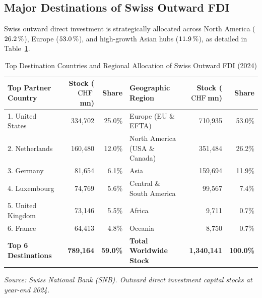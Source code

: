 \subsection{Major Destinations of Swiss Outward FDI}

Swiss outward direct investment is strategically allocated across North America ($26.2\,\%$), Europe ($53.0\,\%$), and high-growth Asian hubs ($11.9\,\%$), as detailed in Table~\ref{tab:outward_summary}.

\begin{table}[H]
\centering
\small
\caption{Top Destination Countries and Regional Allocation of Swiss Outward FDI (2024)}
\label{tab:outward_summary}
\renewcommand{\arraystretch}{1.12}
\begin{tabularx}{\textwidth}{>{\raggedright}X r r | >{\raggedright}X r r}
\toprule
\rowcolor{tableheadbg}
\textbf{Top Partner Country} & \textbf{Stock ($\text{CHF}$\,mn)} & \textbf{Share} & \textbf{Geographic Region} & \textbf{Stock ($\text{CHF}$\,mn)} & \textbf{Share} \\
\midrule
1. United States & 334,702 & 25.0\% & Europe (EU \& EFTA) & 710,935 & 53.0\% \\
\rowcolor{tablerowbg}
2. Netherlands & 160,480 & 12.0\% & North America (USA \& Canada) & 351,484 & 26.2\% \\
3. Germany & 81,654 & 6.1\% & Asia & 159,694 & 11.9\% \\
\rowcolor{tablerowbg}
4. Luxembourg & 74,769 & 5.6\% & Central \& South America & 99,567 & 7.4\% \\
5. United Kingdom & 73,146 & 5.5\% & Africa & 9,711 & 0.7\% \\
\rowcolor{tablerowbg}
6. France & 64,413 & 4.8\% & Oceania & 8,750 & 0.7\% \\
\midrule
\textbf{Top 6 Destinations} & \textbf{789,164} & \textbf{59.0\%} & \textbf{Total Worldwide Stock} & \textbf{1,340,141} & \textbf{100.0\%} \\
\bottomrule
\end{tabularx}
\par\vspace{0.3em}
\footnotesize
\textit{Source: Swiss National Bank (SNB). Outward direct investment capital stocks at year-end 2024.}
\normalsize
\end{table}
